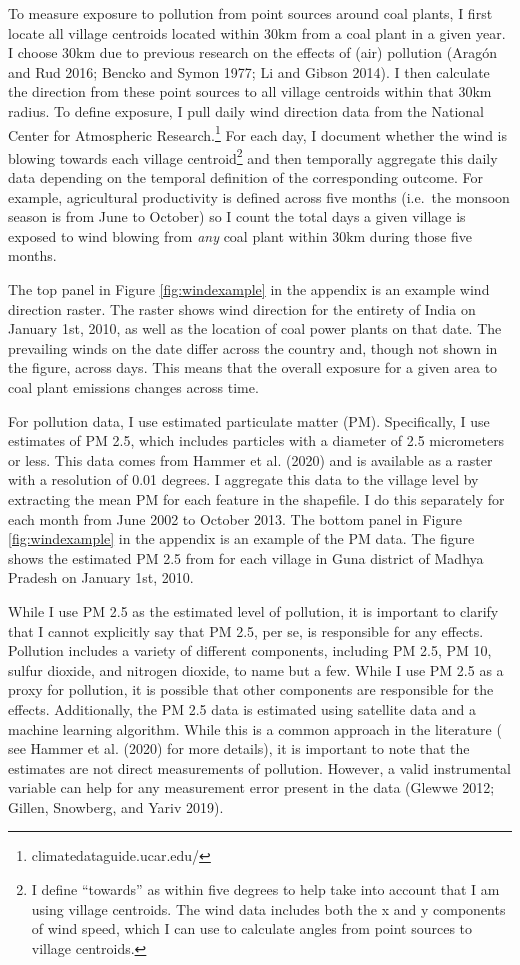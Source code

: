 \documentclass[
]{article}
\begin{document}
To measure exposure to pollution from point sources around coal plants, I first locate all village centroids located within 30km from a coal plant in a given year. I choose 30km due to previous research on the effects of (air) pollution (Aragón and Rud 2016; Bencko and Symon 1977; Li and Gibson 2014). I then calculate the direction from these point sources to all village centroids within that 30km radius. To define exposure, I pull daily wind direction data from the National Center for Atmospheric Research.\footnote{climatedataguide.ucar.edu/} For each day, I document whether the wind is blowing towards each village centroid\footnote{I define ``towards'' as within five degrees to help take into account that I am using village centroids. The wind data includes both the x and y components of wind speed, which I can use to calculate angles from point sources to village centroids.} and then temporally aggregate this daily data depending on the temporal definition of the corresponding outcome. For example, agricultural productivity is defined across five months (i.e.~the monsoon season is from June to October) so I count the total days a given village is exposed to wind blowing from \emph{any} coal plant within 30km during those five months.

The top panel in Figure \ref{fig:windexample} in the appendix is an example wind direction raster. The raster shows wind direction for the entirety of India on January 1st, 2010, as well as the location of coal power plants on that date. The prevailing winds on the date differ across the country and, though not shown in the figure, across days. This means that the overall exposure for a given area to coal plant emissions changes across time.

For pollution data, I use estimated particulate matter (PM). Specifically, I use estimates of PM 2.5, which includes particles with a diameter of 2.5 micrometers or less. This data comes from Hammer et al. (2020) and is available as a raster with a resolution of 0.01 degrees. I aggregate this data to the village level by extracting the mean PM for each feature in the shapefile. I do this separately for each month from June 2002 to October 2013. The bottom panel in Figure \ref{fig:windexample} in the appendix is an example of the PM data. The figure shows the estimated PM 2.5 from for each village in Guna district of Madhya Pradesh on January 1st, 2010.

While I use PM 2.5 as the estimated level of pollution, it is important to clarify that I cannot explicitly say that PM 2.5, per se, is responsible for any effects. Pollution includes a variety of different components, including PM 2.5, PM 10, sulfur dioxide, and nitrogen dioxide, to name but a few. While I use PM 2.5 as a proxy for pollution, it is possible that other components are responsible for the effects. Additionally, the PM 2.5 data is estimated using satellite data and a machine learning algorithm. While this is a common approach in the literature ( see Hammer et al. (2020) for more details), it is important to note that the estimates are not direct measurements of pollution. However, a valid instrumental variable can help for any measurement error present in the data (Glewwe 2012; Gillen, Snowberg, and Yariv 2019).
\end{document}
